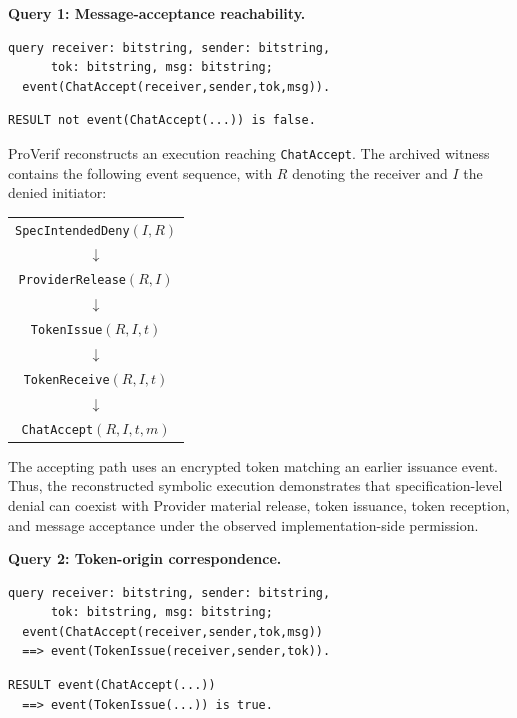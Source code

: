 \noindent\begin{minipage}{\linewidth}
\textbf{Query 1: Message-acceptance reachability.}
\begin{verbatim}
query receiver: bitstring, sender: bitstring,
      tok: bitstring, msg: bitstring;
  event(ChatAccept(receiver,sender,tok,msg)).
\end{verbatim}
\begin{verbatim}
RESULT not event(ChatAccept(...)) is false.
\end{verbatim}
\end{minipage}\par

ProVerif reconstructs an execution reaching\newline
\texttt{ChatAccept}. The archived witness contains
the following event sequence, with $R$ denoting
the receiver and $I$ the denied initiator:

\begin{center}
\small
\begin{tabular}{c}
\texttt{SpecIntendedDeny}$(I,R)$\\
$\downarrow$\\
\texttt{ProviderRelease}$(R,I)$\\
$\downarrow$\\
\texttt{TokenIssue}$(R,I,t)$\\
$\downarrow$\\
\texttt{TokenReceive}$(R,I,t)$\\
$\downarrow$\\
\texttt{ChatAccept}$(R,I,t,m)$
\end{tabular}
\end{center}

The accepting path uses an encrypted token
matching an earlier issuance event. Thus, the
reconstructed symbolic execution demonstrates
that specification-level denial can coexist
with Provider material release, token issuance,
token reception, and message acceptance under
the observed implementation-side permission.

\noindent\begin{minipage}{\linewidth}
\textbf{Query 2: Token-origin correspondence.}
\begin{verbatim}
query receiver: bitstring, sender: bitstring,
      tok: bitstring, msg: bitstring;
  event(ChatAccept(receiver,sender,tok,msg))
  ==> event(TokenIssue(receiver,sender,tok)).
\end{verbatim}
\begin{verbatim}
RESULT event(ChatAccept(...))
  ==> event(TokenIssue(...)) is true.
\end{verbatim}
\end{minipage}\par

